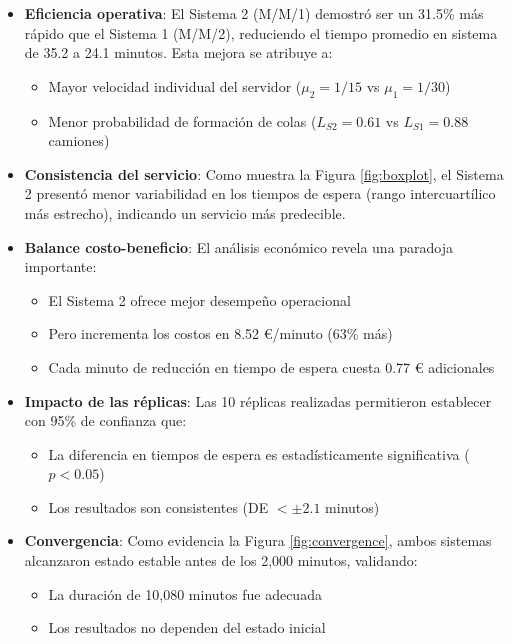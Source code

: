 \documentclass[a4paper, 12pt]{article}
\begin{document}
  \begin{itemize}
  	\item \textbf{Eficiencia operativa}: El Sistema 2 (M/M/1) demostró ser un 31.5\% más rápido que el Sistema 1 (M/M/2), reduciendo el tiempo promedio en sistema de 35.2 a 24.1 minutos. Esta mejora se atribuye a:
  	
  	\begin{itemize}
  		\item Mayor velocidad individual del servidor ($\mu_2 = 1/15$ vs $\mu_1 = 1/30$)
  		\item Menor probabilidad de formación de colas ($L_{S2} = 0.61$ vs $L_{S1} = 0.88$ camiones)
  	\end{itemize}
  	
  	\item \textbf{Consistencia del servicio}: Como muestra la Figura \ref{fig:boxplot}, el Sistema 2 presentó menor variabilidad en los tiempos de espera (rango intercuartílico más estrecho), indicando un servicio más predecible.
  	
  	\item \textbf{Balance costo-beneficio}: El análisis económico revela una paradoja importante:
  	
  	\begin{itemize}
  		\item El Sistema 2 ofrece mejor desempeño operacional
  		\item Pero incrementa los costos en 8.52 €/minuto (63\% más)
  		\item Cada minuto de reducción en tiempo de espera cuesta 0.77 € adicionales
  	\end{itemize}
  	
  	\item \textbf{Impacto de las réplicas}: Las 10 réplicas realizadas permitieron establecer con 95\% de confianza que:
  	
  	\begin{itemize}
  		\item La diferencia en tiempos de espera es estadísticamente significativa ($p < 0.05$)
  		\item Los resultados son consistentes (DE $< \pm 2.1$ minutos)
  	\end{itemize}
  	
  	\item \textbf{Convergencia}: Como evidencia la Figura \ref{fig:convergence}, ambos sistemas alcanzaron estado estable antes de los 2,000 minutos, validando:
  	
  	\begin{itemize}
  		\item La duración de 10,080 minutos fue adecuada
  		\item Los resultados no dependen del estado inicial
  	\end{itemize}
  \end{itemize}
  
\end{document}
